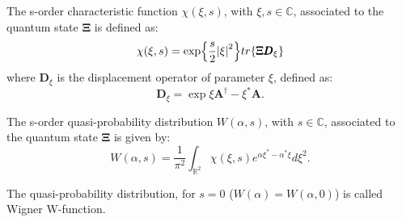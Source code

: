         \begin{definition}
            The s-order characteristic function $\mathcal{\chi}(\xi,s)$, with $\xi,s\in\mathbb{C}$,
            associated to the quantum state $\pmb{\Xi}$ is defined as:
            \begin{equation}
                \mathcal{\chi}(\xi,s)=\exp{\frac{s}{2}\absolutevalue{\xi}^2}
                tr\{\pmb{\Xi}\pmb{D}_\xi\}
            \end{equation}
            where $\pmb{D}_\xi$ is  the displacement operator of parameter $\xi$, defined as:
            \begin{equation}
                \pmb{D}_\xi=\exp{\xi\pmb{A}^\dagger-\xi^*\pmb{A}}.
            \end{equation}
        \end{definition}
        \begin{definition}
            The s-order quasi-probability distribution $W(\alpha,s)$, with $s\in\mathbb{C}$,
            associated to the quantum state $\mathbf{\Xi}$ is given by:
            \begin{equation*}
                W(\alpha,s)=\frac{1}{\pi^2}\int_{\mathbb{R}^2} 
                \mathcal{\chi}(\xi,s)e^{\alpha\xi^*-\alpha^*\xi}d\xi^2.
            \end{equation*}

        \end{definition}
        The quasi-probability distribution, for $s=0$ ($W(\alpha)=W(\alpha,0)$) is called 
        Wigner W-function.